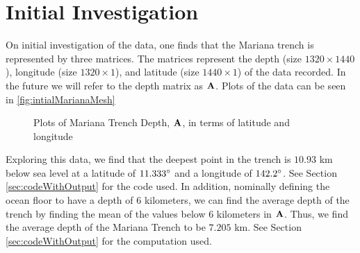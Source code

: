 \section{Initial Investigation}  \label{sec:initInvest}
On initial investigation of the data, one finds that the Mariana trench is represented by three matrices. The matrices represent the depth (size $1320 \times 1440$), longitude (size $1320 \times 1$), and latitude (size $1440 \times 1$) of the data recorded. In the future we will refer to the depth matrix as $\mathbf{A}$. Plots of the data can be seen in \autoref{fig:intialMarianaMesh}
\begin{figure}[H]
    \centering
    \qquad
    \caption{Plots of Mariana Trench Depth, $\mathbf{A}$, in terms of latitude and longitude}%
    \label{fig:intialMarianaMesh}%
\end{figure}
Exploring this data, we find that the deepest point in the trench is $10.93$ km below sea level at a latitude of $11.333\degree$ and a  longitude of $142.2\degree$. See Section \ref{sec:codeWithOutput} for the code used. In addition, nominally defining the ocean floor to have a depth of $6$ kilometers, we can find the average depth of the trench by finding the mean of the values below 6 kilometers in $\mathbf{A}$. Thus, we find the average depth of the Mariana Trench to be $7.205$ km. See Section \ref{sec:codeWithOutput} for the computation used.
